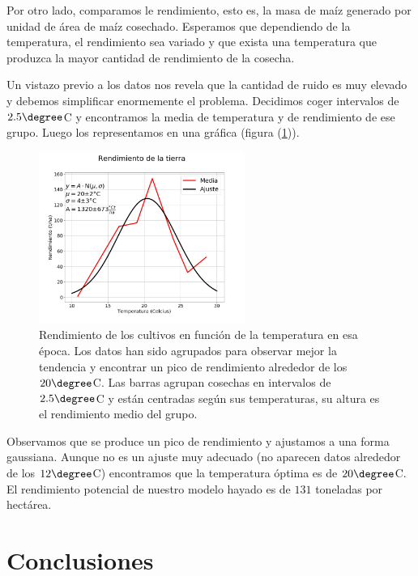 \documentclass[12pt, spanish]{article}
\begin{document}
Por otro lado, comparamos le rendimiento, esto es, la masa de maíz generado por unidad de área de maíz cosechado. Esperamos que dependiendo de la temperatura, el rendimiento sea variado y que exista una temperatura que produzca la mayor cantidad de rendimiento de la cosecha.

Un vistazo previo a los datos nos revela que la cantidad de ruido es muy elevado y debemos simplificar enormemente el problema. Decidimos coger intervalos de $2.5\degree$C y encontramos la media de temperatura y de rendimiento de ese grupo. Luego los representamos en una gráfica (figura (\ref{fig:rendimiento})).
\newpage
\begin{figure}
    \centering
	\includegraphics[width=0.6\textwidth]{rendimiento.png} %
	\caption{Rendimiento de los cultivos en función de la temperatura en esa época. Los datos han sido agrupados para observar mejor la tendencia y encontrar un pico de rendimiento alrededor de los $20\degree$C. Las barras agrupan cosechas en intervalos de $2.5\degree$C y están centradas según sus temperaturas, su altura es el rendimiento medio del grupo.}
	\label{fig:rendimiento}
\end{figure}

Observamos que se produce un pico de rendimiento y ajustamos a una forma gaussiana. Aunque no es un ajuste muy adecuado (no aparecen datos alrededor de los $12\degree$C) encontramos que la temperatura óptima es de $20\degree$C. 
El rendimiento potencial de nuestro modelo hayado es de $131$ toneladas por hectárea.



\section{Conclusiones}
\end{document}
